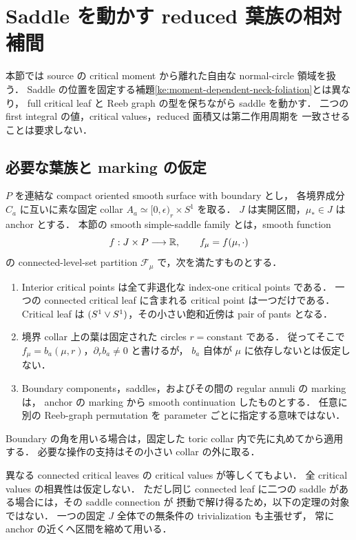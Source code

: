 \section{Saddle を動かす reduced 葉族の相対補間}
\label{ke:relative-reduced-foliations-section}

本節では source の critical moment から離れた自由な normal-circle 領域を扱う．
Saddle の位置を固定する補題\ref{ke:moment-dependent-neck-foliation}とは異なり，
full critical leaf と Reeb graph の型を保ちながら saddle を動かす．
二つの first integral の値，critical values，reduced 面積又は第二作用周期を
一致させることは要求しない．

\subsection{必要な葉族と marking の仮定}

$P$ を連結な compact oriented smooth surface with boundary とし，
各境界成分 $C_a$ に互いに素な固定 collar
$A_a\simeq[0,\epsilon)_r\times S^1$ を取る．
$J$ は実開区間，$\mu_*\in J$ は anchor とする．
本節の smooth simple-saddle family とは，smooth function
\[
 f:J\times P\longrightarrow\mathbb R,\qquad f_\mu=f(\mu,\cdot)
\]
の connected-level-set partition $\mathcal F_\mu$ で，次を満たすものとする．
\begin{enumerate}
\item Interior critical points は全て非退化な index-one critical points である．
  一つの connected critical leaf に含まれる critical point は一つだけである．
  Critical leaf は $(S^1\vee S^1)$，その小さい飽和近傍は pair of pants となる．
\item 境界 collar 上の葉は固定された circles $r=\mathrm{constant}$ である．
  従ってそこで $f_\mu=b_a(\mu,r)$，$\partial_rb_a\ne0$ と書けるが，
  $b_a$ 自体が $\mu$ に依存しないとは仮定しない．
\item Boundary components，saddles，およびその間の regular annuli の marking は，
  anchor の marking から smooth continuation したものとする．
  任意に別の Reeb-graph permutation を parameter ごとに指定する意味ではない．
\end{enumerate}
Boundary の角を用いる場合は，固定した toric collar 内で先に丸めてから適用する．
必要な操作の支持はその小さい collar の外に取る．

異なる connected critical leaves の critical values が等しくてもよい．
全 critical values の相異性は仮定しない．
ただし同じ connected leaf に二つの saddle がある場合には，その saddle connection が
摂動で解け得るため，以下の定理の対象ではない．
一つの固定 $J$ 全体での無条件の trivialization も主張せず，
常に anchor の近くへ区間を縮めて用いる．

